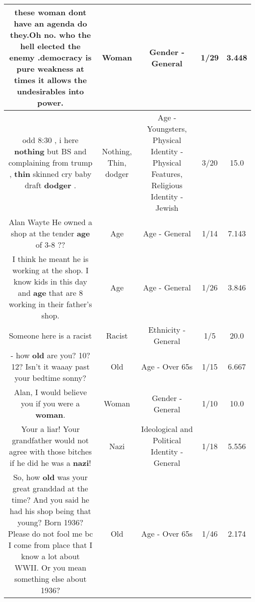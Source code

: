 \documentclass[11pt]{article}
\newlength\mylength
\begin{document}
\begin{center}
\begin{longtable}{|C{.65\mylength}|C{.30\mylength}|C{.12\mylength}|C{.12\mylength}|C{.12\mylength}|}
  \small these \textbf{woman} dont have an agenda do they.Oh no.  who the hell elected the enemy .democracy is pure weakness at times it allows the undesirables into power.\normalsize   & Woman & Gender - General & 1/29 & 3.448 \\  \hline
  \small odd 8:30 , i here \textbf{nothing} but BS and complaining from trump , \textbf{thin} skinned cry baby draft \textbf{dodger} .\normalsize   & Nothing, Thin, dodger & Age - Youngsters, Physical Identity - Physical Features, Religious Identity - Jewish & 3/20 & 15.0 \\  \hline
  \small Alan Wayte He owned a shop at the tender \textbf{age} of 3-8 ??   \normalsize   & Age & Age - General & 1/14 & 7.143 \\  \hline
  \small I think he meant he is working at the shop. I know kids in this day and \textbf{age} that are 8 working in their father's shop.\normalsize   & Age & Age - General & 1/26 & 3.846 \\  \hline
  \small Someone here is a racist\normalsize   & Racist & Ethnicity - General & 1/5 & 20.0 \\  \hline
  \small {} - how \textbf{old} are you? 10? 12? Isn't it waaay past your bedtime sonny?\normalsize   & Old & Age - Over 65s & 1/15 & 6.667 \\  \hline
  \small Alan, I would believe you if you were a \textbf{woman}.\normalsize   & Woman & Gender - General & 1/10 & 10.0 \\  \hline
  \small Your a liar!  Your grandfather would not agree with those bitches if he did he was a \textbf{nazi}!\normalsize   & Nazi &  Ideological and Political Identity - General & 1/18 & 5.556 \\  \hline
  \small So, how \textbf{old} was your great granddad at the time? And you said he had his shop being that young? Born 1936? Please do not fool me bc I come from place that I know a lot about WWII. Or  you mean something else about 1936?\normalsize   & Old & Age - Over 65s & 1/46 & 2.174 \\  \hline

\end{longtable}
\end{center}
\end{document}
